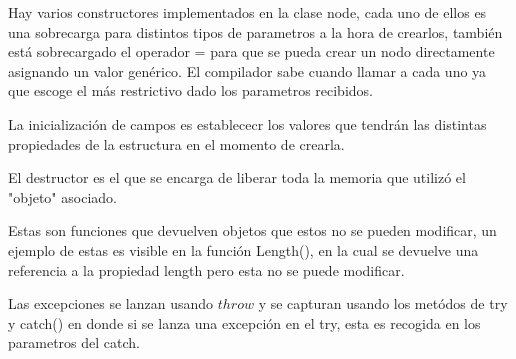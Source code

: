 \documentclass[]{article}
\begin{document}
    \begin{section}{}
        \begin{subsection}{}
            Hay varios constructores implementados en la clase node, cada uno de ellos es una sobrecarga para distintos tipos de parametros a la hora de crearlos, también está sobrecargado el operador = para que se pueda crear un nodo directamente asignando un valor genérico. El compilador sabe cuando llamar a cada uno ya que escoge el más restrictivo dado los parametros recibidos.
        \end{subsection}
        \begin{subsection}{}
            La inicialización de campos es establececr los valores que tendrán las distintas propiedades de la estructura en el momento de crearla.
        \end{subsection}
        \begin{subsection}{}
            
        \end{subsection}
    \end{section}
    \begin{section}{}
        \begin{subsection}{}
            
        \end{subsection}
    \end{section}
    \begin{section}{}
        \begin{subsection}{}
            El destructor es el que se encarga de liberar toda la memoria que utilizó el "objeto" asociado.
        \end{subsection}
        \begin{subsection}{}
            
        \end{subsection}
    \end{section}
    \begin{section}{}
        \begin{subsection}{}
            
        \end{subsection}
        \begin{subsection}{}
            
        \end{subsection}
        \begin{subsection}{}
            
        \end{subsection}
        \begin{subsection}{}
            Estas son funciones que devuelven objetos que estos no se pueden modificar, un ejemplo de estas es visible en la función Length(), en la cual se devuelve una referencia a la propiedad length pero esta no se puede modificar.
        \end{subsection}
        \begin{subsection}{}
            Las excepciones se lanzan usando $throw$ y se capturan usando los metódos de try y catch() en donde si se lanza una excepción en el try, esta es recogida en los parametros del catch.
        \end{subsection}
    \end{section}
\end{document}
